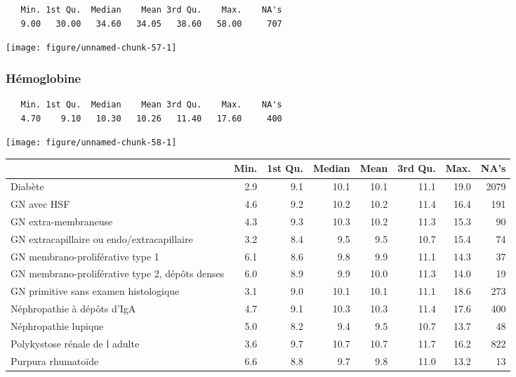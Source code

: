 \documentclass[11pt,a4paper]{article}\usepackage[]{graphicx}\usepackage[]{color}
\makeatletter
\def\maxwidth{ %
  \ifdim\Gin@nat@width>\linewidth
    \linewidth
  \else
    \Gin@nat@width
  \fi
}
\newenvironment{kframe}{%
 \def\at@end@of@kframe{}%
 \ifinner\ifhmode%
  \def\at@end@of@kframe{\end{minipage}}%
  \begin{minipage}{\columnwidth}%
 \fi\fi%
 \def\FrameCommand##1{\hskip\@totalleftmargin \hskip-\fboxsep
 \colorbox{shadecolor}{##1}\hskip-\fboxsep
     \hskip-\linewidth \hskip-\@totalleftmargin \hskip\columnwidth}%
 \MakeFramed {\advance\hsize-\width
   \@totalleftmargin\z@ \linewidth\hsize
   \@setminipage}}%
 {\par\unskip\endMakeFramed%
 \at@end@of@kframe}
\newenvironment{knitrout}{}{} %
\makeatother
\begin{document}
\begin{knitrout}
\color{fgcolor}\begin{kframe}
\begin{verbatim}
   Min. 1st Qu.  Median    Mean 3rd Qu.    Max.    NA's 
   9.00   30.00   34.60   34.05   38.60   58.00     707 
\end{verbatim}
\end{kframe}
\texttt{[image: figure/unnamed-chunk-57-1]} 

\end{knitrout}

\subsubsection*{Hémoglobine}

\begin{knitrout}
\color{fgcolor}\begin{kframe}
\begin{verbatim}
   Min. 1st Qu.  Median    Mean 3rd Qu.    Max.    NA's 
   4.70    9.10   10.30   10.26   11.40   17.60     400 
\end{verbatim}
\end{kframe}
\texttt{[image: figure/unnamed-chunk-58-1]} 

\end{knitrout}

\begin{table}[ht]
\centering
\begin{tabular}{lrrrrrrr}
  \hline
 & Min. & 1st Qu. & Median & Mean & 3rd Qu. & Max. & NA's \\ 
  \hline
Diabète & 2.9 & 9.1 & 10.1 & 10.1 & 11.1 & 19.0 & 2079 \\ 
  GN avec HSF & 4.6 & 9.2 & 10.2 & 10.2 & 11.4 & 16.4 & 191 \\ 
  GN extra-membraneuse & 4.3 & 9.3 & 10.3 & 10.2 & 11.3 & 15.3 & 90 \\ 
  GN extracapillaire ou endo/extracapillaire & 3.2 & 8.4 & 9.5 & 9.5 & 10.7 & 15.4 & 74 \\ 
  GN membrano-proliférative type 1 & 6.1 & 8.6 & 9.8 & 9.9 & 11.1 & 14.3 & 37 \\ 
  GN membrano-proliférative type 2, dépôts denses & 6.0 & 8.9 & 9.9 & 10.0 & 11.3 & 14.0 & 19 \\ 
  GN primitive sans examen histologique & 3.1 & 9.0 & 10.1 & 10.1 & 11.1 & 18.6 & 273 \\ 
  Néphropathie à dépôts d'IgA & 4.7 & 9.1 & 10.3 & 10.3 & 11.4 & 17.6 & 400 \\ 
  Néphropathie lupique & 5.0 & 8.2 & 9.4 & 9.5 & 10.7 & 13.7 & 48 \\ 
  Polykystose rénale de l adulte & 3.6 & 9.7 & 10.7 & 10.7 & 11.7 & 16.2 & 822 \\ 
  Purpura rhumatoïde & 6.6 & 8.8 & 9.7 & 9.8 & 11.0 & 13.2 & 13 \\ 
   \hline
\end{tabular}
\end{table}
\end{document}
